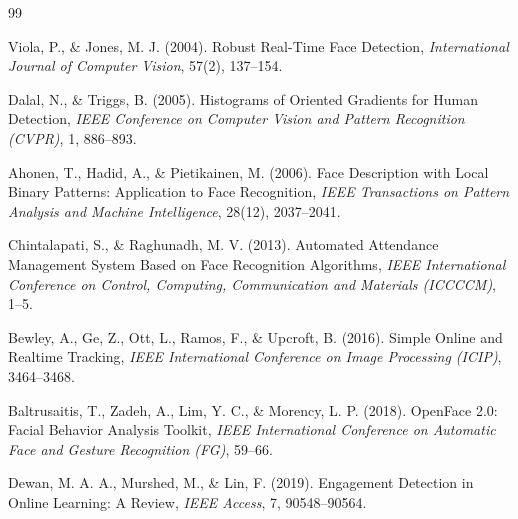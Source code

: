 \documentclass[10pt]{report}
\begin{document}
\begin{thebibliography}{99}

 Viola, P., \& Jones, M. J. (2004). Robust Real-Time Face Detection, \textit{International Journal of Computer Vision}, 57(2), 137--154.

 Dalal, N., \& Triggs, B. (2005). Histograms of Oriented Gradients for Human Detection, \textit{IEEE Conference on Computer Vision and Pattern Recognition (CVPR)}, 1, 886--893.

 Ahonen, T., Hadid, A., \& Pietikainen, M. (2006). Face Description with Local Binary Patterns: Application to Face Recognition, \textit{IEEE Transactions on Pattern Analysis and Machine Intelligence}, 28(12), 2037--2041.

 Chintalapati, S., \& Raghunadh, M. V. (2013). Automated Attendance Management System Based on Face Recognition Algorithms, \textit{IEEE International Conference on Control, Computing, Communication and Materials (ICCCCM)}, 1--5.

 Bewley, A., Ge, Z., Ott, L., Ramos, F., \& Upcroft, B. (2016). Simple Online and Realtime Tracking, \textit{IEEE International Conference on Image Processing (ICIP)}, 3464--3468.

 Baltrusaitis, T., Zadeh, A., Lim, Y. C., \& Morency, L. P. (2018). OpenFace 2.0: Facial Behavior Analysis Toolkit, \textit{IEEE International Conference on Automatic Face and Gesture Recognition (FG)}, 59--66.

 Dewan, M. A. A., Murshed, M., \& Lin, F. (2019). Engagement Detection in Online Learning: A Review, \textit{IEEE Access}, 7, 90548--90564.

\end{thebibliography}
\end{document}
